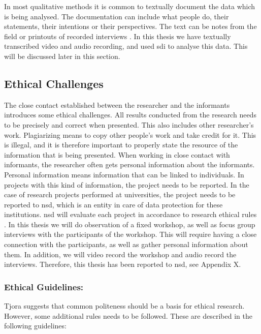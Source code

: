 In most qualitative methods it is common to textually document the data which is being analysed. The documentation can include what people do, their statements, their intentions or their perspectives. The text can be notes from the field or printouts of  recorded interviews \cite{qualitative}. In this thesis we have textually transcribed video and audio recording, and used  \ac{sdi} to analyse this data. This will be discussed later in this section.

\subsection{Ethical Challenges}
The close contact established between the researcher and the informants introduces some ethical challenges. All results conducted from the research needs to be precisely and correct when presented. This also includes other researcher's work. Plagiarizing means to copy other people’s work and take credit for it. This is illegal, and it is therefore important to properly state the resource of the information that is being presented.  When working in close contact with informants, the researcher often gets personal information about the informants. Personal information means information that can be linked to individuals. In projects with this kind of information, the project needs to be reported. In the case of research projects performed at universities, the project needs to be reported to \ac{nsd}, which is an entity in care of data protection for these institutions. \ac{nsd} will evaluate each project in accordance to research ethical rules \cite{qualitative}. In this thesis we will do observation of a fixed workshop, as well as focus group interviews with the participants of the workshop. This will require having a close connection with the participants, as well as gather personal information about them. In addition, we will video record the workshop and audio record the interviews. Therefore, this thesis has been reported to \ac{nsd}, see Appendix X. 

\subsubsection{Ethical Guidelines:}
Tjora \cite{tjora} suggests that common politeness should be a basis for ethical research. However, some additional rules needs to be followed. These are described in the following guidelines:

